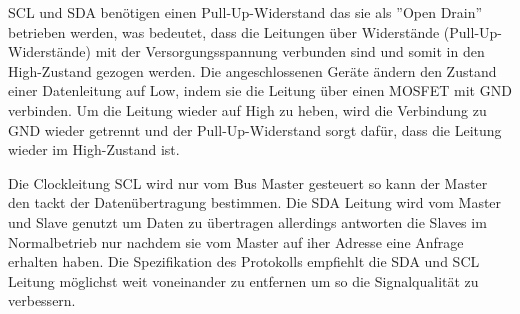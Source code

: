 SCL und SDA benötigen einen Pull-Up-Widerstand das sie als ”Open Drain” betrieben werden, was bedeutet, dass die Leitungen über Widerstände (Pull-Up-Widerstände) mit der Versorgungsspannung verbunden sind und somit in den High-Zustand gezogen werden.
Die angeschlossenen Geräte ändern den Zustand einer Datenleitung auf Low, indem sie die Leitung über einen MOSFET mit GND verbinden.
Um die Leitung wieder auf High zu heben, wird die Verbindung zu GND wieder getrennt und der Pull-Up-Widerstand sorgt dafür, dass die Leitung wieder im High-Zustand ist. 

Die Clockleitung SCL wird nur vom Bus Master gesteuert so kann der Master den tackt der Datenübertragung bestimmen.
Die SDA Leitung wird vom Master und Slave genutzt um Daten zu übertragen allerdings antworten die Slaves im Normalbetrieb nur nachdem sie vom Master auf iher Adresse eine Anfrage erhalten haben. 
Die Spezifikation des Protokolls\cite{nxp_com} empfiehlt die SDA und SCL Leitung möglichst weit voneinander zu entfernen um so die Signalqualität zu verbessern.


